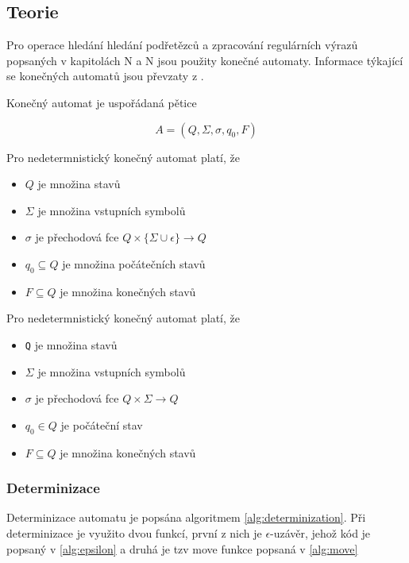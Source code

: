 \subsection{Teorie}

Pro operace hledání hledání podřetězců a zpracování regulárních výrazů popsaných v kapitolách N a N
jsou použity konečné automaty. Informace týkající se konečných automatů jsou převzaty z \cite{meduna}.

Konečný automat je uspořádaná pětice

\begin{huge}
\begin{equation}
A=(Q,\Sigma, \sigma,q_0 ,F)
\end{equation}
\end{huge}

Pro nedetermnistický konečný automat platí, že
\begin{itemize}
	\item{\texttt{$Q$} je množina stavů}
	\item{\texttt{$\Sigma$} je množina vstupních symbolů}
	\item{\texttt{$\sigma$} je přechodová fce $Q \times \{\Sigma \cup \epsilon\} \rightarrow Q$}
	\item{\texttt{$q_0 \subseteq Q$} je množina počátečních stavů}
	\item{\texttt{$F \subseteq Q$} je množina konečných stavů}
\end{itemize}

Pro nedetermnistický konečný automat platí, že

\begin{itemize}
	\item{\texttt{Q} je množina stavů}
	\item{\texttt{$\Sigma$} je množina vstupních symbolů}
	\item{\texttt{$\sigma$} je přechodová fce $Q \times \Sigma \rightarrow Q$}
	\item{\texttt{$q_0 \in Q$} je počáteční stav}
	\item{\texttt{$F \subseteq Q$} je množina konečných stavů}
\end{itemize}

\subsubsection{Determinizace} %
Determinizace automatu je popsána algoritmem \ref{alg:determinization}.
Při determinizace je využito dvou funkcí, první z nich je $\epsilon$-uzávěr, jehož kód je popsaný v \ref{alg:epsilon} a druhá je tzv move funkce popsaná v \ref{alg:move}


